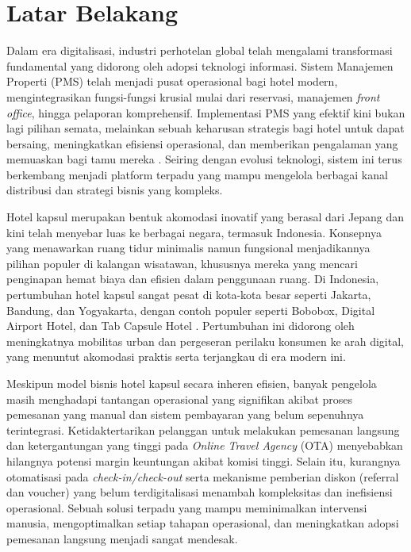 \section{Latar Belakang}

Dalam era digitalisasi, industri perhotelan global telah mengalami transformasi fundamental yang didorong oleh adopsi teknologi informasi. Sistem Manajemen Properti (PMS) telah menjadi pusat operasional bagi hotel modern, mengintegrasikan fungsi-fungsi krusial mulai dari reservasi, manajemen \textit{front office}, hingga pelaporan komprehensif. Implementasi PMS yang efektif kini bukan lagi pilihan semata, melainkan sebuah keharusan strategis bagi hotel untuk dapat bersaing, meningkatkan efisiensi operasional, dan memberikan pengalaman yang memuaskan bagi tamu mereka \cite{kasavana2009managing}. Seiring dengan evolusi teknologi, sistem ini terus berkembang menjadi platform terpadu yang mampu mengelola berbagai kanal distribusi dan strategi bisnis yang kompleks.

Hotel kapsul merupakan bentuk akomodasi inovatif yang berasal dari Jepang dan kini telah menyebar luas ke berbagai negara, termasuk Indonesia. Konsepnya yang menawarkan ruang tidur minimalis namun fungsional menjadikannya pilihan populer di kalangan wisatawan, khususnya mereka yang mencari penginapan hemat biaya dan efisien dalam penggunaan ruang. Di Indonesia, pertumbuhan hotel kapsul sangat pesat di kota-kota besar seperti Jakarta, Bandung, dan Yogyakarta, dengan contoh populer seperti Bobobox, Digital Airport Hotel, dan Tab Capsule Hotel \cite{bobobox}. Pertumbuhan ini didorong oleh meningkatnya mobilitas urban dan pergeseran perilaku konsumen ke arah digital, yang menuntut akomodasi praktis serta terjangkau di era modern ini.

Meskipun model bisnis hotel kapsul secara inheren efisien, banyak pengelola masih menghadapi tantangan operasional yang signifikan akibat proses pemesanan yang manual dan sistem pembayaran yang belum sepenuhnya terintegrasi. Ketidaktertarikan pelanggan untuk melakukan pemesanan langsung dan ketergantungan yang tinggi pada \textit{Online Travel Agency} (OTA) menyebabkan hilangnya potensi margin keuntungan akibat komisi tinggi. Selain itu, kurangnya otomatisasi pada \textit{check-in/check-out} serta mekanisme pemberian diskon (referral dan voucher) yang belum terdigitalisasi menambah kompleksitas dan inefisiensi operasional. Sebuah solusi terpadu yang mampu meminimalkan intervensi manusia, mengoptimalkan setiap tahapan operasional, dan meningkatkan adopsi pemesanan langsung menjadi sangat mendesak.

